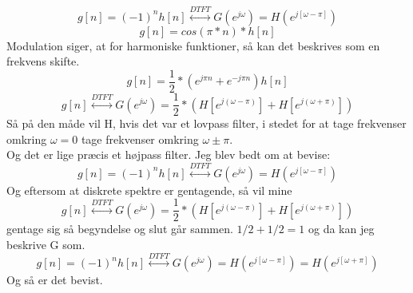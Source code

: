 \begin{Opgaver}
\begin{kapitel}
\begin{Opgave}
\begin{UnderOpgave}[\text{$x[n] = \frac{sin(0.25 \pi n)}{\pi n} \rightarrow y[n] = \frac{sin(0.5 \pi n)}{\pi n}$}]
            \end{UnderOpgave}
        \end{Opgave}
        \begin{Opgave}
            \[g[n] = (-1)^nh[n] \overset{DTFT}{\leftrightarrow} G(e^{j\omega}) = H(e^{j[\omega - \pi]})\]
            \[g[n] = cos(\pi*n) * h[n]\]
            Modulation siger, at for harmoniske funktioner, så kan det beskrives som en frekvens skifte. 
            \[g[n] = \frac{1}{2} * (e^{j\pi n} +e^{-j\pi n})h[n]\]
            \[g[n] \overset{DTFT}{\leftrightarrow} G(e^{j\omega}) = \frac{1}{2} * (H[e^{j(\omega - \pi)}] + H[e^{j(\omega + \pi)}])\]
            Så på den måde vil H, hvis det var et lovpass filter, i stedet for at tage frekvenser omkring $\omega = 0$ tage frekvenser omkring $\omega \pm \pi$.\\
            Og det er lige præcis et højpass filter. 
            Jeg blev bedt om at bevise: 
            \[g[n] = (-1)^nh[n] \overset{DTFT}{\leftrightarrow} G(e^{j\omega}) = H(e^{j[\omega - \pi]})\]
            Og eftersom at diskrete spektre er gentagende, så vil mine
            \[g[n] \overset{DTFT}{\leftrightarrow} G(e^{j\omega}) = \frac{1}{2} * (H[e^{j(\omega - \pi)}] + H[e^{j(\omega + \pi)}])\]
            gentage sig så begyndelse og slut går sammen. $1/2 + 1/2 = 1$ og da kan jeg beskrive G som. 
            \[g[n] = (-1)^nh[n] \overset{DTFT}{\leftrightarrow} G(e^{j\omega}) = H(e^{j[\omega - \pi]}) = H(e^{j[\omega + \pi]})\]
            Og så er det bevist.\\\\\\



\end{Opgave}
\end{kapitel}
\end{Opgaver}
